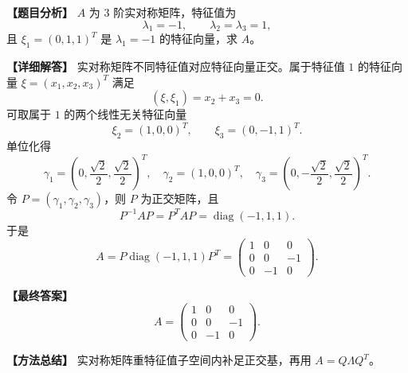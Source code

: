 \documentclass[11pt,a4paper,UTF8]{ctexart}
\newcommand{\diag}{\operatorname{diag}}
\begin{document}
\begin{answerbox}
\textbf{【题目分析】} $A$ 为 $3$ 阶实对称矩阵，特征值为
\[
\lambda_1=-1,\qquad \lambda_2=\lambda_3=1,
\]
且 $\xi_1=(0,1,1)^T$ 是 $\lambda_1=-1$ 的特征向量，求 $A$。

\textbf{【详细解答】} 实对称矩阵不同特征值对应特征向量正交。属于特征值 $1$ 的特征向量 $\xi=(x_1,x_2,x_3)^T$ 满足
\[
(\xi,\xi_1)=x_2+x_3=0.
\]
可取属于 $1$ 的两个线性无关特征向量
\[
\xi_2=(1,0,0)^T,\qquad \xi_3=(0,-1,1)^T.
\]
单位化得
\[
\gamma_1=\left(0,\frac{\sqrt2}{2},\frac{\sqrt2}{2}\right)^T,\quad
\gamma_2=(1,0,0)^T,\quad
\gamma_3=\left(0,-\frac{\sqrt2}{2},\frac{\sqrt2}{2}\right)^T.
\]
令 $P=(\gamma_1,\gamma_2,\gamma_3)$，则 $P$ 为正交矩阵，且
\[
P^{-1}AP=P^TAP=\diag(-1,1,1).
\]
于是
\[
A=P\diag(-1,1,1)P^T
=\begin{pmatrix}1&0&0\\0&0&-1\\0&-1&0\end{pmatrix}.
\]

\textbf{【最终答案】}
\[
A=\begin{pmatrix}1&0&0\\0&0&-1\\0&-1&0\end{pmatrix}.
\]

\textbf{【方法总结】} 实对称矩阵重特征值子空间内补足正交基，再用 $A=Q\Lambda Q^T$。
\end{answerbox}
\end{document}
